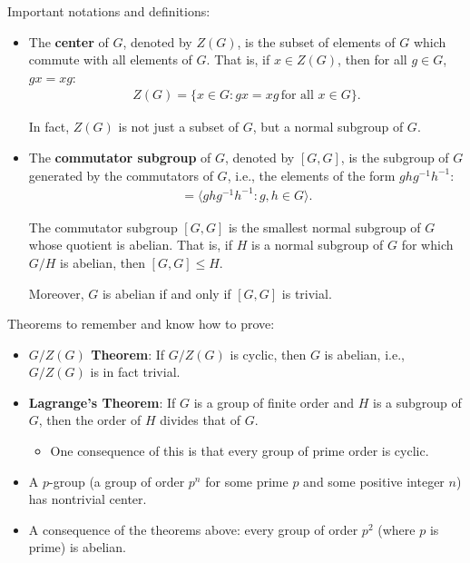 \begin{concept}

\envlist

Important notations and definitions:

\begin{itemize}
\item
  The \textbf{center} of \(G\), denoted by \(Z(G)\), is the subset of
  elements of \(G\) which commute with all elements of \(G\). That is,
  if \(x \in Z(G)\), then for all \(g \in G\), \(gx = xg\):
  \begin{align*}Z(G) = \{ x \in G : gx = xg \, \text{for all } x \in G \}.\end{align*}

  In fact, \(Z(G)\) is not just a subset of \(G\), but a normal subgroup
  of \(G\).
\item
  The \textbf{commutator subgroup} of \(G\), denoted by \([G, G]\), is
  the subgroup of \(G\) generated by the commutators of \(G\), i.e., the
  elements of the form \(ghg^{-1}h^{-1}\):
  \begin{align*}[G, G] = \langle ghg^{-1}h^{-1} : g, h \in G \rangle.\end{align*}

  The commutator subgroup \([G,G]\) is the smallest normal subgroup of
  \(G\) whose quotient is abelian. That is, if \(H\) is a normal
  subgroup of \(G\) for which \(G/H\) is abelian, then \([G, G] \le H\).

  Moreover, \(G\) is abelian if and only if \([G,G]\) is trivial.
\end{itemize}

Theorems to remember and know how to prove:

\begin{itemize}
\item
  \textbf{\(G/Z(G)\) Theorem}: If \(G/Z(G)\) is cyclic, then \(G\) is
  abelian, i.e., \(G/Z(G)\) is in fact trivial.
\item
  \textbf{Lagrange's Theorem}: If \(G\) is a group of finite order and
  \(H\) is a subgroup of \(G\), then the order of \(H\) divides that of
  \(G\).

  \begin{itemize}
  \tightlist
  \item
    One consequence of this is that every group of prime order is
    cyclic.
  \end{itemize}
\item
  A \(p\)-group (a group of order \(p^n\) for some prime \(p\) and some
  positive integer \(n\)) has nontrivial center.
\item
  A consequence of the theorems above: every group of order \(p^2\)
  (where \(p\) is prime) is abelian.
\end{itemize}

\end{concept}

